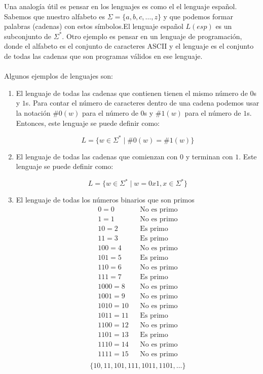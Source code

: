 Una analogía útil es pensar en los lenguajes es como el el lenguaje español. Sabemos que nuestro
alfabeto es $\Sigma = \{a, b, c, \ldots, z\}$ y que podemos formar palabras (cadenas) con estos símbolos.El 
lenguaje español $L(esp)$ es un subconjunto de $\Sigma^*$. Otro ejemplo es pensar en un lenguaje de programación, donde el alfabeto es el conjunto de caracteres ASCII y 
el lenguaje es el conjunto de todas las cadenas que son programas válidos en ese lenguaje.
\\ \\ 
Algunos ejemplos de lenguajes son:

\begin{enumerate}
    \item El lenguaje de todas las cadenas que contienen tienen el mismo número de $0$s y $1$s. Para contar el número de caracteres dentro 
    de una cadena podemos usar la notación $\#0(w)$ para el número de $0$s y $\#1(w)$ para el número de $1$s. Entonces, este lenguaje se puede definir como:

    $$L = \{w \in \Sigma^* \mid \#0(w) = \#1(w)\}$$

    \item El lenguaje de todas las cadenas que comienzan con $0$ y terminan con $1$. Este lenguaje se puede definir como:

    $$L = \{w \in \Sigma^* \mid w = 0x1, x \in \Sigma^*\}$$

    \item El lenguaje de todas los números binarios que son primos 
    \begin{align*}
        0  = 0 && \text{No es primo} \\ 
        1  = 1 && \text{No es primo} \\ 
        10 = 2 && \text{Es primo} \\ 
        11 = 3 && \text{Es primo} \\ 
        100 = 4 && \text{No es primo} \\ 
        101 = 5 && \text{Es primo} \\ 
        110 = 6 && \text{No es primo} \\ 
        111 = 7 && \text{Es primo} \\ 
        1000 = 8 && \text{No es primo} \\ 
        1001 = 9 && \text{No es primo} \\ 
        1010 = 10 && \text{No es primo} \\ 
        1011 = 11 && \text{Es primo} \\ 
        1100 = 12 && \text{No es primo} \\ 
        1101 = 13 && \text{Es primo} \\ 
        1110 = 14 && \text{No es primo} \\ 
        1111 = 15 && \text{No es primo} \\ 
    \end{align*}
    $$\{10, 11, 101, 111, 1011, 1101, \dots\}$$


\end{enumerate}
